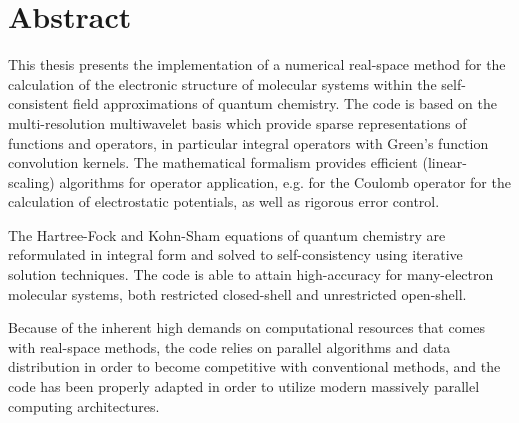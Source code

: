 \chapter*{Abstract}
This thesis presents the implementation of a numerical real-space 
method for the calculation of the electronic structure of molecular systems
within the self-consistent field approximations of quantum chemistry. The
code is based on the multi-resolution multiwavelet basis which provide
sparse representations of functions and operators, in particular integral
operators with Green's function convolution kernels. The mathematical
formalism provides efficient (linear-scaling) algorithms for operator
application, e.g. for the Coulomb operator for the calculation of 
electrostatic potentials, as well as rigorous error control.

The Hartree-Fock and Kohn-Sham equations of quantum chemistry are reformulated 
in integral form and solved to self-consistency using iterative solution 
techniques. The code is able to attain high-accuracy for many-electron 
molecular systems, both restricted closed-shell and unrestricted open-shell.

Because of the inherent high demands on computational resources that
comes with real-space methods, the code relies on parallel algorithms and
data distribution in order to become competitive with conventional methods,
and the code has been properly adapted in order to utilize modern massively 
parallel computing architectures.

\pagebreak
\ 
\pagebreak
